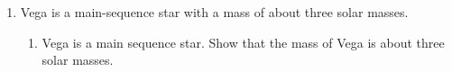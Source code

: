 \documentclass[a4paper,12pt]{article}
\begin{document}
\begin{enumerate}[label=(\alph*)]
  \item Vega is a main-sequence star with a mass of about three solar masses.
        \begin{enumerate}[label=(\roman*)]
          \item Vega is a main sequence star. Show that the mass of Vega is about three solar masses.
                \begin{align*}

                \end{align*}
        \end{enumerate}

\end{enumerate}
\end{document}
